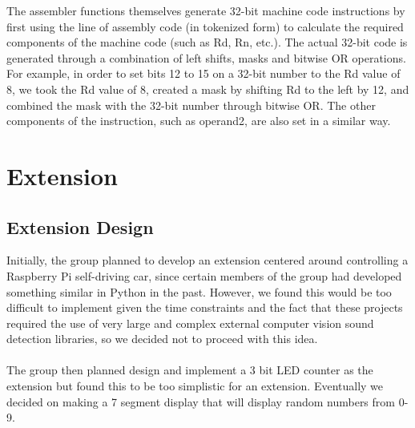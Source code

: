 \documentclass[11pt,twoside]{article}
\begin{document}
The assembler functions themselves generate 32-bit machine code instructions by first using the line of assembly code (in tokenized form) to calculate the required components of the machine code (such as Rd, Rn, etc.). The actual 32-bit code is generated through a combination of left shifts, masks and bitwise OR operations. For example, in order to set bits 12 to 15 on a 32-bit number to the Rd value of 8, we took the Rd value of 8, created a mask by shifting Rd to the left by 12, and combined the mask with the 32-bit number through bitwise OR. The other components of the instruction, such as operand2, are also set in a similar way. \\

\section{Extension}
\subsection{Extension Design}
Initially, the group planned to develop an extension centered around controlling a Raspberry Pi self-driving car, since certain members of the group had developed something similar in Python in the past. However, we found this would be too difficult to implement given the time constraints and the fact that these projects required the use of very large and complex external computer vision sound detection libraries, so we decided not to proceed with this idea.\\\\
The group then planned design and implement a 3 bit LED counter as the extension but found this to be too simplistic for an extension. Eventually we decided on making a 7 segment display that will display random numbers from 0-9.\\
\end{document}

